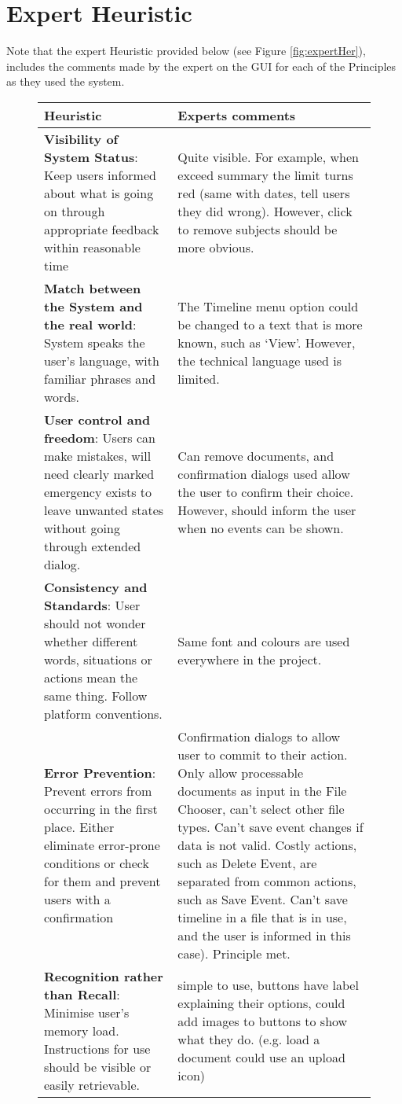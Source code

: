 \section{Expert Heuristic}
\par Note that the expert Heuristic provided below (see Figure \ref{fig:expertHer}), includes the comments made by the expert on the GUI for each of the Principles as they used the system.
\begin{figure}[h]
\begin{tabular}{|p{6cm}|p{8cm}|}
\hline
Heuristic & Experts comments \\
\hline
\hline
\textbf{Visibility of System Status}: Keep users informed about what is going on through appropriate feedback within reasonable time & Quite visible. For example, when exceed summary the limit turns red (same with dates, tell users they did wrong). However, click to remove subjects should be more obvious.\\
\hline
\textbf{Match between the System and the real world}: System speaks the user's language, with familiar phrases and words. & The Timeline menu option could be changed to a text that is more known, such as `View'. However, the technical language used is limited.\\
\hline
\textbf{User control and freedom}: Users can make mistakes, will need clearly marked emergency exists to leave unwanted states without going through extended dialog. & Can remove documents, and confirmation dialogs used allow the user to confirm their choice. However, should inform the user when no events can be shown.\\
\hline
\textbf{Consistency and Standards}: User should not wonder whether different words, situations or actions mean the same thing. Follow platform conventions. & Same font and colours are used everywhere in the project.\\
\hline
\textbf{Error Prevention}: Prevent errors from occurring in the first place. Either eliminate error-prone conditions or check for them and prevent users with a confirmation & Confirmation dialogs to allow user to commit to their action. Only allow processable documents as input in the File Chooser, can't select other file types. Can't save event changes if data is not valid. Costly actions, such as Delete Event, are separated from common actions, such as Save Event. Can't save timeline in a file that is in use, and the user is informed in this case). Principle met.\\
\hline
\textbf{Recognition rather than Recall}: Minimise user's memory load. Instructions for use should be visible or easily retrievable. &simple to use, buttons have label explaining their options, could add images to buttons to show what they do. (e.g. load a document could use an upload icon)\\

\end{tabular}
\end{figure}
